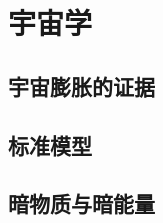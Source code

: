 

\section{宇宙学}\label{30-5}

\subsection{宇宙膨胀的证据}\label{30-5-1}

\subsection{标准模型}\label{30-5-2}

\subsection{暗物质与暗能量}\label{30-5-3}